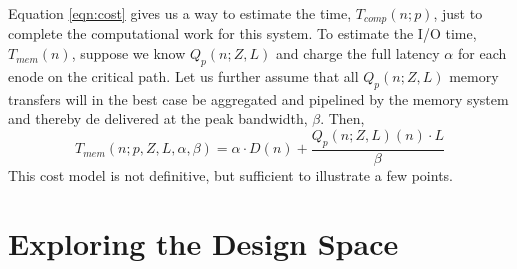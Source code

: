 \documentclass[twocolumn]{article}
\begin{document}
Equation \ref{eqn:cost} gives us a way to estimate the time, $T_{comp}(n; p)$, just to complete the computational work for this system. To estimate the I/O time, $T_{mem}(n)$, suppose we know $Q_p(n; Z, L)$ and charge the full latency $\alpha$ for each enode on the critical path. 
Let us further assume that all $Q_p(n; Z, L)$ memory transfers will in the best case be aggregated and pipelined by the memory system and thereby de delivered at the peak bandwidth, $\beta$. Then,
\begin{equation}
T_{mem}(n; p, Z, L, \alpha, \beta) = \alpha \cdot D(n) + \frac{Q_p(n; Z, L)(n) \cdot L}{\beta}
\end{equation}
This cost model is not definitive, but sufficient to illustrate a few points.
 \section{Exploring the Design Space}
\end{document}
